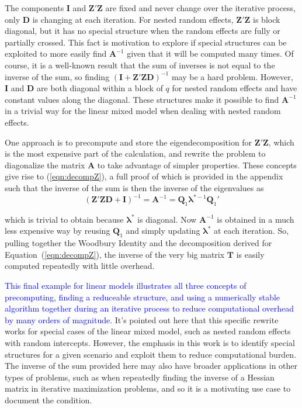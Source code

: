 \documentclass[12pt]{article}
\begin{document}
The components $\bm{I}$ and $\bm{Z}'\bm{Z}$ are fixed and never change over the iterative process, only $\bm{D}$ is changing at each iteration. For nested random effects, $\bm{Z}'\bm{Z}$ is block diagonal, but it has no special structure when the random effects are fully or partially crossed. This fact is motivation to explore if special structures can be exploited to more easily find $\bm{A}^{-1}$ given that it will be computed many times. Of course, it is a well-known result that the sum of inverses is not equal to the inverse of the sum, so finding $(\bm{I} +  \bm{Z}'\bm{Z}\bm{D})^{-1}$ may be a hard problem. However, $\bm{I}$ and $\bm{D}$ are both diagonal within a block of $q$ for nested random effects and have constant values along the diagonal. These structures make it possible to find $\bm{A}^{-1}$ in a trivial way for the linear mixed model when dealing with nested random effects. 

One approach is to precompute and store the eigendecomposition for $\bm{Z}'\bm{Z}$, which is the most expensive part of the calculation, and rewrite the problem to diagonalize the matrix $\bm{A}$ to take advantage of simpler properties. These concepts give rise to (\ref{eqn:decompZ}), a full proof of which is provided in the appendix such that the inverse of the sum is then the inverse of the eigenvalues as   
\begin{equation}
\label{eqn:decompZ}
(\bm{Z}'\bm{Z}\bm{D} + \bm{I})^{-1} = \bm{A}^{-1} = \bm{Q}_1 \bm{\lambda}^{*-1} \bm{Q}_1'
\end{equation}

\noindent which is trivial to obtain because $\bm{\lambda}^{*}$ is diagonal.  Now $\bm{A}^{-1}$ is obtained in a much less expensive way by reusing $\bm{Q}_1$ and simply updating $\bm{\lambda}^*$ at each iteration. So, pulling together the Woodbury Identity and the decomposition derived for Equation~(\ref{eqn:decompZ}), the inverse of the very big matrix $\bm{T}$ is easily computed repeatedly with little overhead.

\textcolor{blue}{This final example for linear models illustrates all three concepts of precomputing, finding a reduceable structure, and using a numerically stable algorithm together during an iterative process to reduce computational overhead by many orders of magnitude.} It's pointed out here that this specific rewrite works for special cases of the linear mixed model, such as nested random effects with random intercepts. However, the emphasis in this work is to identify special structures for a given scenario and exploit them to reduce computational burden. The inverse of the sum provided here may also have broader applications in other types of problems, such as when repeatedly finding the inverse of a Hessian matrix in iterative maximization problems, and so it is a motivating use case to document the condition. 
\end{document}
